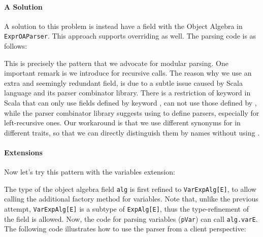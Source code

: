 
\paragraph{A Solution}
A solution to this problem is instead have a field with the Object Algebra
in \lstinline{ExprOAParser}. This approach supports overriding as well.
The parsing code is as follows:

This is precisely the pattern that we advocate for modular parsing.
One important remark is we introduce  for recursive calls.
The reason why we use an extra and seemingly redundant field, is due to a subtle issue caused by Scala language and its parser combinator library. There is a restriction of  keyword in Scala that  can only use fields defined by keyword , can not use those defined by , while the parser combinator library suggests using  to define parsers, especially for left-recursive ones. Our workaround is that we use different synonyms for  in different traits, so that we can directly distinguish them by names without using .

\paragraph{Extensions}
Now let's try this pattern with the variables extension:


\noindent The type of the object algebra field \lstinline{alg} is first refined
to \lstinline{VarExpAlg[E]}, to allow calling the additional factory method
for variables. Note that, unlike the previous attempt, \lstinline{VarExpAlg[E]}
is a subtype of \lstinline{ExpAlg[E]}, thus the type-refinement of the
field is allowed. Now, the code for parsing variables (\lstinline{pVar}) can
call \lstinline{alg.varE}. The following code illustrates how to use
the parser from a client perspective:


